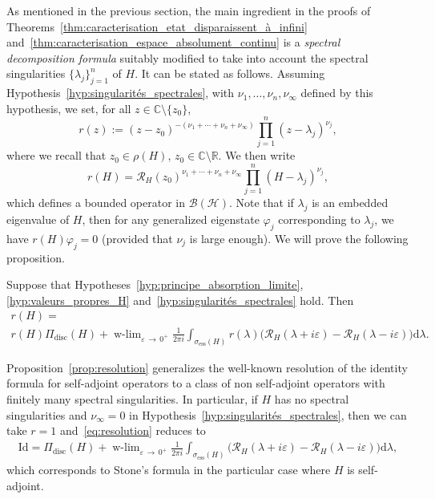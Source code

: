 \documentclass[AHL,Unicode,longabstracts,published]{cedram}
\newcommand{\Hi}{\mathcal{H}}
\newcommand{\bbC}{\mathbb{C}}
\newcommand{\R}{\mathbb{R}}
\newcommand{\ess}{\mathrm{ess}}
\newcommand{\rmd}{\mathrm{d}}
\newcommand{\disc}{\mathrm{disc}}
\newcommand{\Res}{\mathcal{R}}
\newcommand{\clB}{\mathcal{B}}
\DeclareMathOperator{\wlim}{w-lim}
\newcommand*\bbC{\mathbb{C}}
\newcommand{\Hi}{\mathcal{H}}
\newcommand{\R}{\mathbb{R}}
\newcommand{\ess}{\mathrm{ess}}
\begin{document}
As mentioned in the previous section, the main ingredient in the proofs of Theorems~\ref{thm:caracterisation_etat_disparaissent_à_infini} and~\ref{thm:caracterisation_espace_absolument_continu} is a \emph{spectral decomposition formula} suitably modified to take into account the spectral singularities $\lbrace \lambda_j\rbrace_{j=1}^n$ of $H$. It can be stated as follows. Assuming Hypothesis~\ref{hyp:singularités_spectrales}, with $\nu_1,\dots,\nu_n,\nu_\infty$ defined by this hypothesis, we set, for all $z\in\bbC\setminus\{z_0\}$,
\begin{equation}\label{eq:def_r}
r(z) := (z-z_0)^{-(\nu_1+\cdots+\nu_n+\nu_\infty)} \prod_{j=1}^n \left(z-\lambda_j\right)^{\nu_j},
\end{equation}
where we recall that $z_0\in\rho(H)$, $z_0\in\bbC\setminus\R$. We then write
\begin{equation*}
r(H) = \Res_H(z_0)^{\nu_1+\cdots+\nu_n+\nu_\infty} \prod_{j=1}^n \left(H-\lambda_j\right)^{\nu_j},
\end{equation*}
which defines a bounded operator in $\clB(\Hi)$. Note that if $\lambda_j$ is an embedded eigenvalue of $H$, then for any generalized eigenstate $\varphi_j$ corresponding to $\lambda_j$, we have $r(H)\varphi_j=0$ (provided that $\nu_j$ is large enough). We will prove the following proposition.

\begin{prop}\label{prop:resolution}
Suppose that Hypotheses~\ref{hyp:principe_absorption_limite}, \ref{hyp:valeurs_propres_H} and~\ref{hyp:singularités_spectrales} hold. Then
\begin{multline}\label{eq:resolution}
r(H) =\\
r(H)\Pi_{\disc}(H) + \wlim_{\varepsilon\,\rightarrow \,0^+}\frac{1}{2\pi i}\int_{\sigma_{\ess}(H)}r(\lambda)\big(\Res_{H}(\lambda+i\varepsilon)-\Res_{H}(\lambda-i\varepsilon)\big)\rmd \lambda. 
\end{multline}
\end{prop}

Proposition~\ref{prop:resolution} generalizes the well-known resolution of the identity formula for self-adjoint operators to a class of non self-adjoint operators with finitely many spectral singularities. In particular, if $H$ has no spectral singularities and $\nu_\infty=0$ in Hypothesis~\ref{hyp:singularités_spectrales}, then we can take $r=1$ and~\eqref{eq:resolution} reduces to
\begin{align*}
\mathrm{Id} = \Pi_{\disc}(H) + \wlim_{\varepsilon\,\rightarrow\,0^+}\frac{1}{2\pi i}\int_{\sigma_{\ess}(H)}\big(\Res_{H}(\lambda+i\varepsilon)-\Res_{H}(\lambda-i\varepsilon)\big)\rmd \lambda,
\end{align*}
which corresponds to Stone's formula in the particular case where $H$ is self-adjoint.
\end{document}
